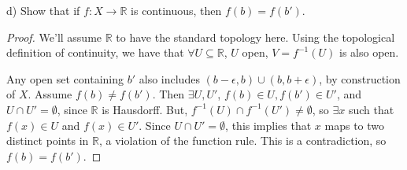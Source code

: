 \documentclass[11pt]{article}
\begin{document}
d) Show that if \(f: X\rightarrow \mathbb{R}\) is continuous, then \(f(b)
   = f(b')\).

\begin{proof}
We'll assume \(\mathbb{R}\) to have the standard topology here. Using
the topological definition of continuity, we have that \(\forall
U\subseteq\mathbb{R}\), \(U\) open, \(V = f^{-1}(U)\) is also open.

Any open set containing \(b'\) also includes \((b - \epsilon,
b)\cup(b, b+\epsilon)\), by construction of \(X\). Assume \(f(b) \not =
f(b')\). Then \(\exists U, U'\), \(f(b)\in U, f(b')\in U'\), and \(U\cap U'
= \emptyset\), since \(\mathbb{R}\) is Hausdorff. But, \(f^{-1}(U)\cap
f^{-1}(U') \not = \emptyset\), so \(\exists x\) such that \(f(x) \in U\)
and \(f(x) \in U'\). Since \(U\cap U' = \emptyset\), this implies that \(x\)
maps to two distinct points in \(\mathbb{R}\), a violation of the
function rule. This is a contradiction, so \(f(b) = f(b')\). 
\end{proof}
\end{document}
